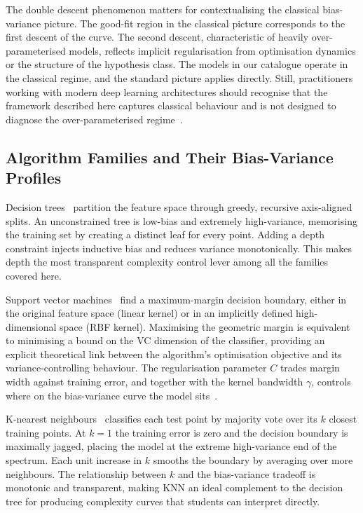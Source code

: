 \documentclass[conference]{IEEEtran}
\begin{document}
The double descent phenomenon matters for contextualising the classical bias-variance picture. The good-fit region in the classical picture corresponds to the first descent of the curve. The second descent, characteristic of heavily over-parameterised models, reflects implicit regularisation from optimisation dynamics or the structure of the hypothesis class. The models in our catalogue operate in the classical regime, and the standard picture applies directly. Still, practitioners working with modern deep learning architectures should recognise that the framework described here captures classical behaviour and is not designed to diagnose the over-parameterised regime~\cite{b23}.

\subsection{Algorithm Families and Their Bias-Variance Profiles}

Decision trees~\cite{b9} partition the feature space through greedy, recursive axis-aligned splits. An unconstrained tree is low-bias and extremely high-variance, memorising the training set by creating a distinct leaf for every point. Adding a depth constraint injects inductive bias and reduces variance monotonically. This makes depth the most transparent complexity control lever among all the families covered here.

Support vector machines~\cite{b10} find a maximum-margin decision boundary, either in the original feature space (linear kernel) or in an implicitly defined high-dimensional space (RBF kernel). Maximising the geometric margin is equivalent to minimising a bound on the VC dimension of the classifier, providing an explicit theoretical link between the algorithm's optimisation objective and its variance-controlling behaviour. The regularisation parameter $C$ trades margin width against training error, and together with the kernel bandwidth $\gamma$, controls where on the bias-variance curve the model sits~\cite{b24}.

K-nearest neighbours~\cite{b11, b20} classifies each test point by majority vote over its $k$ closest training points. At $k=1$ the training error is zero and the decision boundary is maximally jagged, placing the model at the extreme high-variance end of the spectrum. Each unit increase in $k$ smooths the boundary by averaging over more neighbours. The relationship between $k$ and the bias-variance tradeoff is monotonic and transparent, making KNN an ideal complement to the decision tree for producing complexity curves that students can interpret directly.
\end{document}
